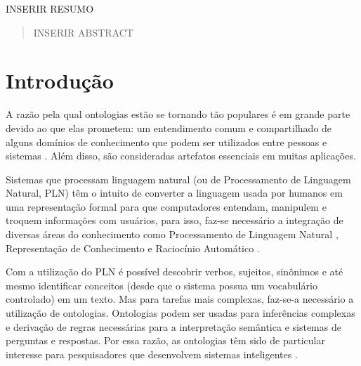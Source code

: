 \documentclass{bcc}
\begin{document}

\capa



\begin{resumo}
INSERIR RESUMO
\end{resumo}

\begin{abstract}
INSERIR ABSTRACT
\end{abstract}

\renewcommand\contentsname{\centerline{Sumário}}
\renewcommand\listfigurename{\centerline{Lista de Figuras}}
\renewcommand\listtablename{\centerline{Lista de Tabelas}}

\tableofcontents

\listoffigures
{}

\listoftables
{}

\inicio
\chapter{Introdução}

A razão pela qual ontologias estão se tornando tão populares é em grande parte devido ao que elas prometem: um entendimento comum e compartilhado de alguns domínios de conhecimento que podem ser utilizados entre pessoas e sistemas \cite{fensel2001}. Além disso, são consideradas artefatos essenciais em muitas aplicações.

Sistemas que processam linguagem natural (ou de Processamento de Linguagem Natural, PLN) têm o intuito de converter a linguagem usada por humanos em uma representação formal para que computadores entendam, manipulem e troquem informações com usuários, para isso, faz-se necessário a integração de diversas áreas do conhecimento como Processamento de Linguagem Natural \cite{brill1995}, Representação de Conhecimento \cite{levesque1986} e Raciocínio Automático \cite{wos1984}.

Com a utilização do PLN é possível descobrir verbos, sujeitos, sinônimos e até mesmo identificar conceitos (desde que o sistema possua um vocabulário controlado) em um texto. Mas para tarefas mais complexas, faz-se-a necessário a utilização de ontologias. Ontologias podem ser usadas para inferências complexas e derivação de regras necessárias para a interpretação semântica e sistemas de perguntas e respostas. Por essa razão, as ontologias têm sido de particular interesse para pesquisadores que desenvolvem sistemas inteligentes \cite{liu2011}.
\end{document}
